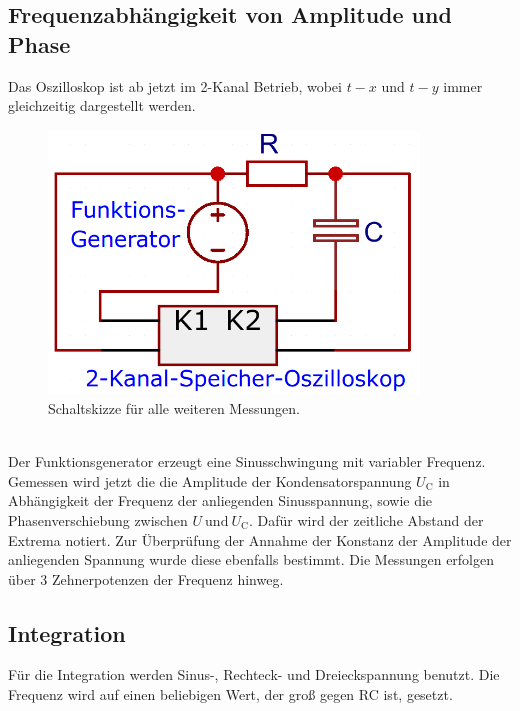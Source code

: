 \subsection{Frequenzabhängigkeit von Amplitude und Phase}
\label{sec:messung2}
Das Oszilloskop ist ab jetzt im 2-Kanal Betrieb, wobei $t-x$ und $t-y$ immer
gleichzeitig dargestellt werden.
\begin{figure}
  \centering
  \includegraphics[height=7cm]{content/Bilder/Aufbau-2.jpg}
  \caption{Schaltskizze für alle weiteren Messungen.}
  \label{fig:aufbau2}
\end{figure}\\
Der Funktionsgenerator erzeugt eine Sinusschwingung mit variabler Frequenz.
Gemessen wird jetzt die die Amplitude der Kondensatorspannung $U_\text{C}$ in
Abhängigkeit der Frequenz der anliegenden Sinusspannung, sowie die Phasenverschiebung
zwischen $U \:\text{und}\: U_\text{C}$. Dafür wird der zeitliche Abstand der Extrema
notiert. Zur Überprüfung der Annahme der Konstanz der Amplitude der anliegenden
Spannung wurde diese ebenfalls bestimmt.
Die Messungen erfolgen über 3 Zehnerpotenzen der Frequenz hinweg.


\subsection{Integration}
\label{sec:messung3}
Für die Integration werden Sinus-, Rechteck- und Dreieckspannung benutzt.
Die Frequenz wird auf einen beliebigen Wert, der groß gegen RC ist, gesetzt.

\newpage
